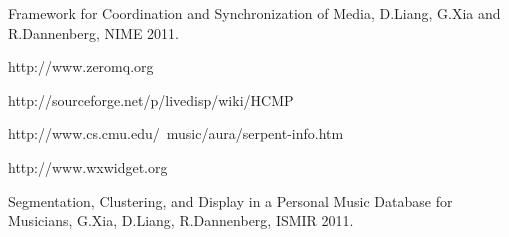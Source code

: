 \documentclass[12pt]{Latex/Classes/PhDthesisPSnPDF}
\begin{document}
\setcounter{page}{2}

\frontmatter



\setcounter{secnumdepth}{3} %
\setcounter{tocdepth}{3}    %
\tableofcontents %

\listoffigures	%

\listoftables

\newpage %


\pagestyle{headings}
\setcounter{page}{1}

\mainmatter
\renewcommand{\chaptername}{} %



			
	
%




\begin{thebibliography}{99} %

Framework for Coordination and Synchronization of Media, D.Liang, G.Xia and R.Dannenberg, NIME 2011.

http://www.zeromq.org

http://sourceforge.net/p/livedisp/wiki/HCMP%

http://www.cs.cmu.edu/~music/aura/serpent-info.htm

http://www.wxwidget.org

Segmentation, Clustering, and Display in a Personal Music Database for Musicians,
G.Xia, D.Liang, R.Dannenberg, ISMIR 2011.

\end{thebibliography}

\end{document}
